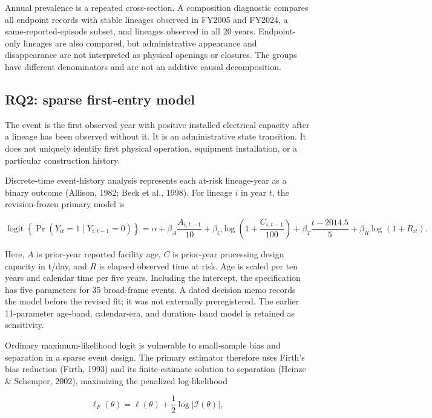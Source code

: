 \documentclass[11pt,letterpaper]{article}
\begin{document}
Annual prevalence is a repeated cross-section. A composition diagnostic
compares all endpoint records with stable lineages observed in FY2005 and
FY2024, a same-reported-episode subset, and lineages observed in all 20 years.
Endpoint-only lineages are also compared, but administrative appearance and
disappearance are not interpreted as physical openings or closures. The groups
have different denominators and are not an additive causal decomposition.

\subsection{RQ2: sparse first-entry model}

The event is the first observed year with positive installed electrical capacity
after a lineage has been observed without it. It is an administrative state
transition. It does not uniquely identify first physical operation, equipment
installation, or a particular construction history.

Discrete-time event-history analysis represents each at-risk lineage-year as a
binary outcome (Allison, 1982; Beck et al., 1998). For lineage $i$ in year
$t$, the revision-frozen primary model is

\begin{equation}
\operatorname{logit}\!\left\{\Pr(Y_{it}=1\mid Y_{i,t-1}=0)\right\}
=\alpha+\beta_A\frac{A_{i,t-1}}{10}
+\beta_C\log\!\left(1+\frac{C_{i,t-1}}{100}\right)
+\beta_T\frac{t-2014.5}{5}
+\beta_R\log(1+R_{it}).
\label{eq:entry-model}
\end{equation}

Here, $A$ is prior-year reported facility age, $C$ is prior-year processing
design capacity in t/day, and $R$ is elapsed observed time at risk. Age is
scaled per ten years and calendar time per five years. Including the intercept,
the specification has five parameters for 35 broad-frame events. A dated
decision memo records the model before the revised fit; it was not externally
preregistered. The earlier 11-parameter age-band, calendar-era, and duration-
band model is retained as sensitivity.

Ordinary maximum-likelihood logit is vulnerable to small-sample bias and
separation in a sparse event design. The primary estimator therefore uses
Firth's bias reduction (Firth, 1993) and its finite-estimate solution to
separation (Heinze \& Schemper, 2002), maximizing the penalized log-likelihood

\begin{equation}
\ell_F(\theta)=
\ell(\theta)+
\frac{1}{2}\log\left|\mathcal{I}(\theta)\right|,
\label{eq:firth}
\end{equation}
\end{document}
